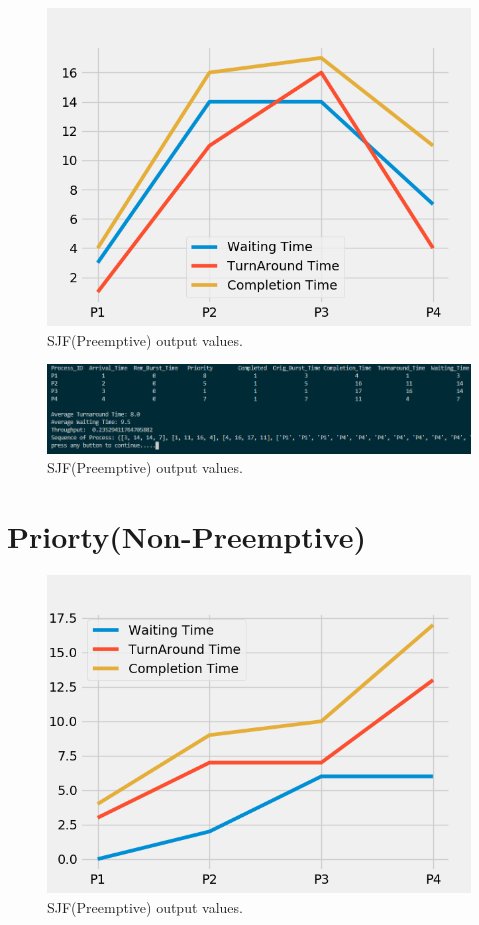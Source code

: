 \documentclass[11pt,a4paper]{report}
\begin{document}
{\begin{figure}[H]
	\centering
	\includegraphics[scale=0.75]{./img/PRIORITY_P_output.png}
	\caption{SJF(Preemptive) output values.}
\end{figure}}

{\begin{figure}[H]
	\centering
	\includegraphics[scale=0.5]{./img/priority_p_out.PNG}
	\caption{SJF(Preemptive) output values.}
\end{figure}}

\section{Priorty(Non-Preemptive)}

{\begin{figure}[H]
	\centering
	\includegraphics[scale=0.75]{./img/PRIORITY_NP_output.png}
	\caption{SJF(Preemptive) output values.}
\end{figure}}
\end{document}
